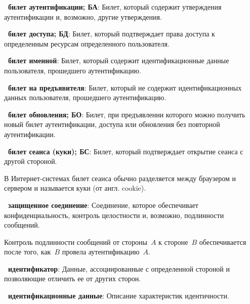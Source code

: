 {\bf \thedefctr~билет аутентификации; БА}:
Билет, который содержит утверждения аутентификации и, возможно, другие
утверждения.

{\bf \thedefctr~билет доступа; БД}:
Билет, который подтверждает права доступа к определенным ресурсам определенного 
пользователя.

{\bf \thedefctr~билет именной}:
Билет, который содержит идентификационные данные пользователя, прошедшего 
аутентификацию.

{\bf \thedefctr~билет на предъявителя}:
Билет, который не содержит идентификационных данных пользователя, прошедшего 
аутентификацию.

{\bf \thedefctr~билет обновления; БО}:
Билет, при предъявлении которого можно получить новый билет 
аутентификации, доступа или обновления без повторной аутентификации.


{\bf \thedefctr~билет сеанса (куки); БС}:
Билет, который подтверждает открытие сеанса с другой стороной. 

\begin{note*}
В Интернет-системах билет сеанса обычно разделяется между браузером и 
сервером и называется куки (от англ. cookie).
\end{note*}

{\bf \thedefctr~защищенное соединение}: %
Соединение, которое обеспечивает конфиденциальность, 
контроль целостности и, возможно, подлинности сообщений. 

\begin{note*}
Контроль подлинности сообщений от стороны~$A$ к стороне~$B$ 
обеспечивается после того, как~$B$ провела аутентификацию~$A$.
\end{note*}

{\bf \thedefctr~идентификатор}:
Данные, ассоциированные с определенной стороной и позволяющие 
отличить ее от других сторон.





{\bf \thedefctr~идентификационные данные}:
Описание характеристик идентичности. 

